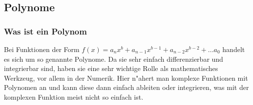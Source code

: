 \subsection{Polynome} \label{polynom}
\subsubsection{Was ist ein Polynom}
Bei Funktionen der Form $f(x) = a_n x^b + a_{n-1} x^{b-1} + a_{n-2} x^{b-2} + ... a_0$ handelt es sich um so genannte Polynome. Da sie sehr einfach differenzierbar und integrierbar sind, haben sie eine sehr wichtige Rolle als mathematisches Werkzeug, vor allem in der Numerik. Hier n"ahert man komplexe Funktionen mit Polynomen an und kann diese dann einfach ableiten oder integrieren, was mit der komplexen Funktion meist nicht so einfach ist.

